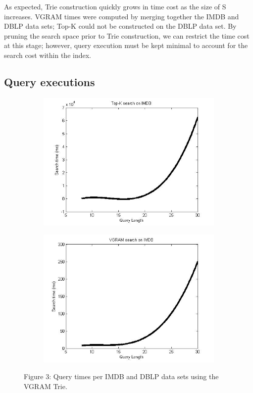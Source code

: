 \documentclass[pdftex,12pt,letter]{article}
\begin{document}
As expected, Trie construction quickly grows in time cost as the size of S increases. VGRAM times were computed by merging together the IMDB and DBLP data sets; Top-K could not be constructed on the DBLP data set. By pruning the search space prior to Trie construction, we can restrict the time cost at this stage; however, query execution must be kept minimal to account for the search cost within the index.

\subsection{Query executions}
\begin{figure}[h!]
\centering
\begin{subfigure}[b]{0.45\textwidth}
\includegraphics[width=\textwidth]{TOPKonIMDB.jpg}
\label{fig:imdb}
\end{subfigure}
\begin{subfigure}[b]{0.45\textwidth}
\includegraphics[width=\textwidth]{VGRAMonIMDB.jpg}
\label{fig:dblp}
\end{subfigure}
\begin{center}
Figure 3: Query times per IMDB and DBLP data sets using the VGRAM Trie.
\end{center}
\end{figure}
\end{document}
